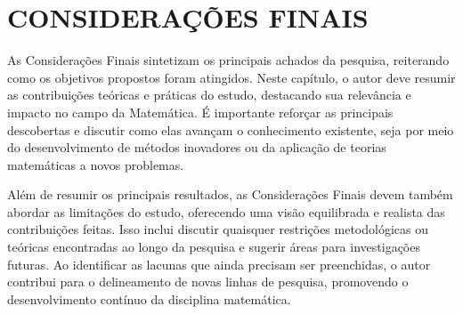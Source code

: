 
\chapter{CONSIDERAÇÕES FINAIS}

As Considerações Finais sintetizam os principais achados da pesquisa, reiterando como os objetivos propostos foram atingidos. Neste capítulo, o autor deve resumir as contribuições teóricas e práticas do estudo, destacando sua relevância e impacto no campo da Matemática. É importante reforçar as principais descobertas e discutir como elas avançam o conhecimento existente, seja por meio do desenvolvimento de métodos inovadores ou da aplicação de teorias matemáticas a novos problemas.

Além de resumir os principais resultados, as Considerações Finais devem também abordar as limitações do estudo, oferecendo uma visão equilibrada e realista das contribuições feitas. Isso inclui discutir quaisquer restrições metodológicas ou teóricas encontradas ao longo da pesquisa e sugerir áreas para investigações futuras. Ao identificar as lacunas que ainda precisam ser preenchidas, o autor contribui para o delineamento de novas linhas de pesquisa, promovendo o desenvolvimento contínuo da disciplina matemática.
